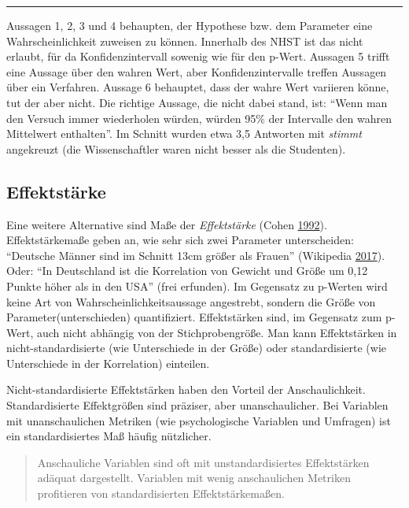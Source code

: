 \documentclass[12pt,ngerman,]{book}
\theoremstyle{definition}
\theoremstyle{definition}
\theoremstyle{remark}
\begin{document}
\begin{center}\rule{0.5\linewidth}{\linethickness}\end{center}

Aussagen 1, 2, 3 und 4 behaupten, der Hypothese bzw. dem Parameter eine
Wahrscheinlichkeit zuweisen zu können. Innerhalb des NHST ist das nicht
erlaubt, für da Konfidenzintervall sowenig wie für den p-Wert. Aussagen
5 trifft eine Aussage über den wahren Wert, aber Konfidenzintervalle
treffen Aussagen über ein Verfahren. Aussage 6 behauptet, dass der wahre
Wert variieren könne, tut der aber nicht. Die richtige Aussage, die
nicht dabei stand, ist: ``Wenn man den Versuch immer wiederholen würden,
würden 95\% der Intervalle den wahren Mittelwert enthalten''. Im Schnitt
wurden etwa 3,5 Antworten mit \emph{stimmt} angekreuzt (die
Wissenschaftler waren nicht besser als die Studenten).

\subsection{Effektstärke}\label{effektstarke}

Eine weitere Alternative sind Maße der
\emph{Effektstärke} (Cohen
\protect\hyperlink{ref-Cohen1992}{1992}). Effektstärkemaße geben an, wie
sehr sich zwei Parameter unterscheiden: ``Deutsche Männer sind im
Schnitt 13cm größer als Frauen'' (Wikipedia
\protect\hyperlink{ref-wiki:groesse}{2017}). Oder: ``In Deutschland ist
die Korrelation von Gewicht und Größe um 0,12 Punkte höher als in den
USA'' (frei erfunden). Im Gegensatz zu p-Werten wird keine Art von
Wahrscheinlichkeitsaussage angestrebt, sondern die Größe von
Parameter(unterschieden) quantifiziert. Effektstärken sind, im Gegensatz
zum p-Wert, auch nicht abhängig von der Stichprobengröße. Man kann
Effektstärken in nicht-standardisierte (wie Unterschiede in der Größe)
oder standardisierte (wie Unterschiede in der Korrelation) einteilen.

Nicht-standardisierte Effektstärken haben den Vorteil der
Anschaulichkeit. Standardisierte Effektgrößen sind präziser, aber
unanschaulicher. Bei Variablen mit unanschaulichen Metriken (wie
psychologische Variablen und Umfragen) ist ein standardisiertes Maß
häufig nützlicher.

\begin{quote}
Anschauliche Variablen sind oft mit unstandardisiertes Effektstärken
adäquat dargestellt. Variablen mit wenig anschaulichen Metriken
profitieren von standardisierten Effektstärkemaßen.
\end{quote}
\end{document}
